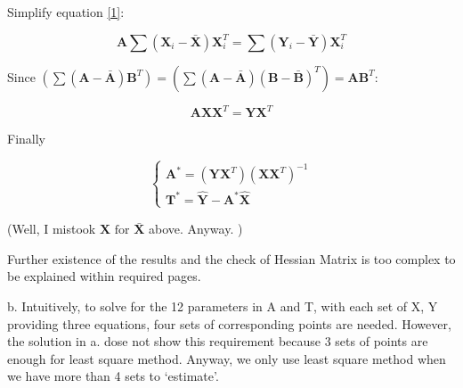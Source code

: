 \documentclass{article}
\theoremstyle{definition}
\begin{document}
	Simplify equation \ref{1}:
	
	\begin{equation}
		\mathbf A \sum (\mathbf X_i-\mathbf{\bar X})\mathbf X_i^T = \sum(\mathbf Y_i - \mathbf {\bar Y})\mathbf X_i^T
	\end{equation}
	
	Since $(\sum (\mathbf A - \mathbf {\bar A})\mathbf B^T) = (\sum (\mathbf A - \mathbf {\bar A})(\mathbf B - \mathbf{\bar B})^T) = \mathbf A\mathbf B^T$:
	
	\begin{equation}
		\mathbf A \mathbf X \mathbf X^T = \mathbf Y \mathbf X ^T
	\end{equation}
	
	Finally 
	
	\begin{equation}
		\begin{cases}
			\mathbf A^* = (\mathbf Y \mathbf X^T)(\mathbf X \mathbf X^T)^{-1}\\
			\mathbf T^* = \hat{\mathbf Y} - \mathbf A^* \hat{\mathbf X} 
		\end{cases}
	\end{equation}
	
	(Well, I mistook $\hat{\mathbf X} \text{ for } \mathbf {\bar X}$ above. Anyway. )
	
	Further existence of the results and the check of Hessian Matrix is too complex to be explained within required pages. 
	
	b.
	Intuitively, to solve for the 12 parameters in A and T, with each set of X, Y providing three equations, four sets of corresponding points are needed. However, the solution in a. dose not show this requirement because 3 sets of points are enough for least square method. Anyway, we only use least square method when we have more than 4 sets to `estimate'.
	
\end{document}
